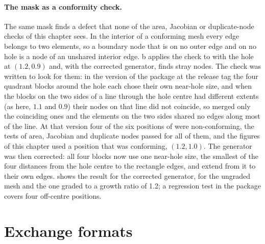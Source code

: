 \paragraph{The mask as a conformity check.} The same mask finds a defect that none of the area, Jacobian or duplicate-node checks of this chapter sees. In the interior of a conforming mesh every edge belongs to two elements, so a boundary node that is on no outer edge and on no hole is a node of an unshared interior edge. b applies the check to  with the hole at $(1.2,0.9)$ and, with the corrected generator, finds \cmeBmStrayBad{} stray nodes. The check was written to look for them: in the version of the package at the release tag the four quadrant blocks around the hole each chose their own near-hole size, and when the blocks on the two sides of a line through the hole centre had different extents (as here, $1.1$ and $0.9$) their nodes on that line did not coincide, so  merged only the coinciding ones and the elements on the two sides shared no edges along most of the line. At that version four of the six positions of  were non-conforming, the tests of area, Jacobian and duplicate nodes passed for all of them, and the figures of this chapter used a position that was conforming, $(1.2,1.0)$. The generator was then corrected: all four blocks now use one near-hole size, the smallest of the four distances from the hole centre to the rectangle edges, and extend from it to their own edges.  shows the result for the corrected generator, for the ungraded mesh and the one graded to a growth ratio of 1.2; a regression test in the package covers four off-centre positions.

\begin{table}[ht]
\centering\small

\caption{Boundary nodes of  (and of ) that lie neither on the four straight edges of the $3\times2$ rectangle nor on the hole of radius 0.3, for six hole positions, with the corrected generator. A conforming mesh has none.}\label{tab:me-conform}
\end{table}

\section{Exchange formats}\label{sec:me-io}

